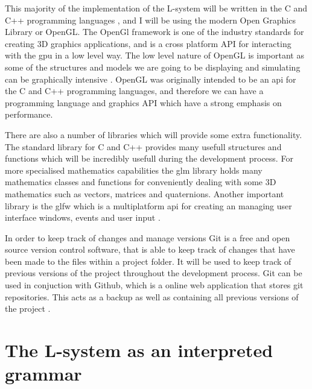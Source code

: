 \begin{flushleft}

This majority of the implementation of the L-system will be written in the C and C++ programming languages \cite{stroustrup2000c++}, and I will be using the modern Open Graphics Library or \gls{OpenGL}. The OpenGl framework is one of the industry standards for creating 3D graphics applications, and is a cross platform API for interacting with the \acrshort{gpu} in a low level way. The low level nature of OpenGL is important as some of the structures and models we are going to be displaying and simulating can be graphically intensive \cite{sellers2013opengl} \cite{movania2017opengl}. OpenGL was originally intended to be an \acrshort{api} for the C and C++ programming languages, and therefore we can have a programming language and graphics API which have a strong emphasis on performance.

\vspace{5mm}

There are also a number of libraries which will provide some extra functionality. The standard library for C and C++ provides many usefull structures and functions which will be incredibly usefull during the development process. For more specialised mathematics capabilities the \acrfull{glm} library holds many mathematics classes and functions for conveniently dealing with some 3D mathematics such as vectors, matrices and quaternions. Another important library is the \acrfull{glfw} which is a multiplatform \acrshort{api} for creating an managing user interface windows, events and user input \cite{glfwDocumentation}.

\vspace{5mm}

In order to keep track of changes and manage versions Git is a free and open source version control software, that is able to keep track of changes that have been made to the files within a project folder. It will be used to keep track of previous versions of the project throughout the development process. Git can be used in conjuction with Github, which is a online web application that stores git repositories. This acts as a backup as well as containing all previous versions of the project \cite{torvalds}.

\end{flushleft}

\section{The L-system as an interpreted grammar}

